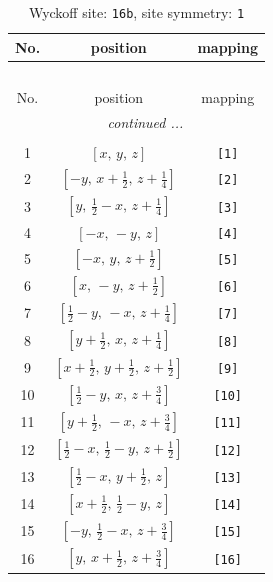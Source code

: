 \documentclass[fleqn,8pt]{jsarticle}
\begin{document}
\begin{longtable}{ccc}
\caption{Wyckoff site: {\tt 16b}, site symmetry: {\tt 1}}
 \\
 \hline \hline
No. & position & mapping \\ \hline \endfirsthead

\multicolumn{2}{l}{\tablename\ \thetable{}} \\
 \hline \hline
No. & position & mapping \\ \hline \endhead

 \hline \hline
\multicolumn{2}{r}{\footnotesize\it continued ...} \\ \endfoot

 \hline \hline
\multicolumn{2}{r}{} \\ \endlastfoot

1 & $\left[ x,\, y,\, z \right]$ & {\tt [1]} \\ \hline
2 & $\left[ - y,\, x + \frac{1}{2},\, z + \frac{1}{4} \right]$ & {\tt [2]} \\ \hline
3 & $\left[ y,\, \frac{1}{2} - x,\, z + \frac{1}{4} \right]$ & {\tt [3]} \\ \hline
4 & $\left[ - x,\, - y,\, z \right]$ & {\tt [4]} \\ \hline
5 & $\left[ - x,\, y,\, z + \frac{1}{2} \right]$ & {\tt [5]} \\ \hline
6 & $\left[ x,\, - y,\, z + \frac{1}{2} \right]$ & {\tt [6]} \\ \hline
7 & $\left[ \frac{1}{2} - y,\, - x,\, z + \frac{1}{4} \right]$ & {\tt [7]} \\ \hline
8 & $\left[ y + \frac{1}{2},\, x,\, z + \frac{1}{4} \right]$ & {\tt [8]} \\ \hline
9 & $\left[ x + \frac{1}{2},\, y + \frac{1}{2},\, z + \frac{1}{2} \right]$ & {\tt [9]} \\ \hline
10 & $\left[ \frac{1}{2} - y,\, x,\, z + \frac{3}{4} \right]$ & {\tt [10]} \\ \hline
11 & $\left[ y + \frac{1}{2},\, - x,\, z + \frac{3}{4} \right]$ & {\tt [11]} \\ \hline
12 & $\left[ \frac{1}{2} - x,\, \frac{1}{2} - y,\, z + \frac{1}{2} \right]$ & {\tt [12]} \\ \hline
13 & $\left[ \frac{1}{2} - x,\, y + \frac{1}{2},\, z \right]$ & {\tt [13]} \\ \hline
14 & $\left[ x + \frac{1}{2},\, \frac{1}{2} - y,\, z \right]$ & {\tt [14]} \\ \hline
15 & $\left[ - y,\, \frac{1}{2} - x,\, z + \frac{3}{4} \right]$ & {\tt [15]} \\ \hline
16 & $\left[ y,\, x + \frac{1}{2},\, z + \frac{3}{4} \right]$ & {\tt [16]} \\
\end{longtable}
\end{document}
